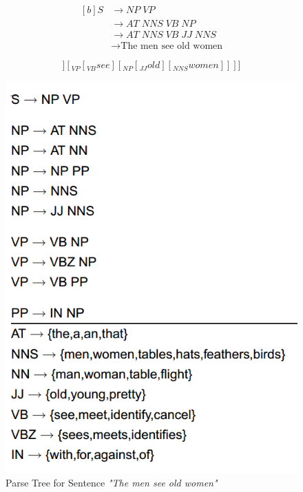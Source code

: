 \documentclass{article}
\begin{document}
\begin{equation}
\begin{aligned}[b]
	S &\rightarrow NP\; VP \\
	&\rightarrow AT \; NNS \; VB \; NP \\
	&\rightarrow AT \; NNS \; VB \; JJ \; NNS \\
	&\rightarrow \text{The men see old women}
	\label{eq:example-sentence-derivation}
\end{aligned}
\end{equation}

\begin{equation}
	[_{S}[_{NP}[_{AT}the] [_{NNS}men]] [_{VP}[_{VB}see] [_{NP}[_{JJ}old] [_{NNS}women]]]]
	\label{eq:example-sentence-derivation-bracketing}
\end{equation}

\begin{figure}
	\centering
	\includegraphics[scale=0.4]{figures/example-grammar.png}
	\caption{Parse Tree for Sentence \textit{"The men see old women"}}
	\label{fig:sentence-parse-tree}
\end{figure}
\end{document}
